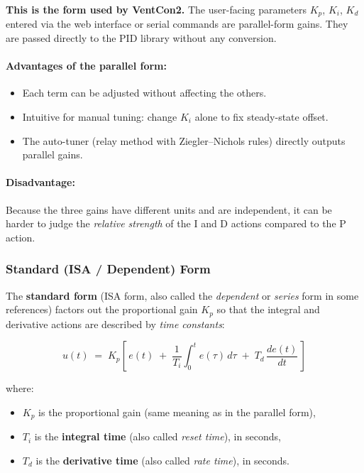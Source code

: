 \documentclass[12pt,a4paper]{article}
\begin{document}
\noindent
\textbf{This is the form used by VentCon2.} The user-facing parameters $K_p$, $K_i$, $K_d$ entered via the web interface or serial commands are parallel-form gains. They are passed directly to the PID library without any conversion.

\paragraph{Advantages of the parallel form:}
\begin{itemize}
    \item Each term can be adjusted without affecting the others.
    \item Intuitive for manual tuning: change $K_i$ alone to fix steady-state offset.
    \item The auto-tuner (relay method with Ziegler--Nichols rules) directly outputs parallel gains.
\end{itemize}

\paragraph{Disadvantage:}
Because the three gains have different units and are independent, it can be harder to judge
the \emph{relative strength} of the I and D actions compared to the P action.

\subsubsection{Standard (ISA / Dependent) Form}

The \textbf{standard form} (ISA form, also called the \emph{dependent} or \emph{series} form in some references) factors out the proportional gain $K_p$ so that the integral and derivative actions are described by \emph{time constants}:

\begin{equation}
    \boxed{u(t) \;=\; K_p \!\left[\, e(t) \;+\; \frac{1}{T_i}\!\int_0^t e(\tau)\,d\tau \;+\; T_d \,\frac{de(t)}{dt} \,\right]}
    \label{eq:pid-standard}
\end{equation}

where:
\begin{itemize}
    \item $K_p$ is the proportional gain (same meaning as in the parallel form),
    \item $T_i$ is the \textbf{integral time} (also called \emph{reset time}), in seconds,
    \item $T_d$ is the \textbf{derivative time} (also called \emph{rate time}), in seconds.
\end{itemize}
\end{document}
